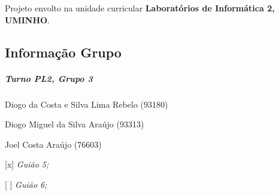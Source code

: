 Projeto envolto na unidade curricular {\bfseries Laboratórios de Informática 2, U\+M\+I\+N\+HO}.

\subsection*{Informação Grupo}

\subparagraph*{Turno P\+L2, Grupo 3}


\begin{DoxyItemize}
\item Diogo da Costa e Silva Lima Rebelo (93180)
\item Diogo Miguel da Silva Araújo (93313)
\item Joel Costa Araújo (76603)
\item \mbox{[}x\mbox{]} {\itshape Guião 5;}
\item \mbox{[} \mbox{]} {\itshape Guião 6;} 
\end{DoxyItemize}